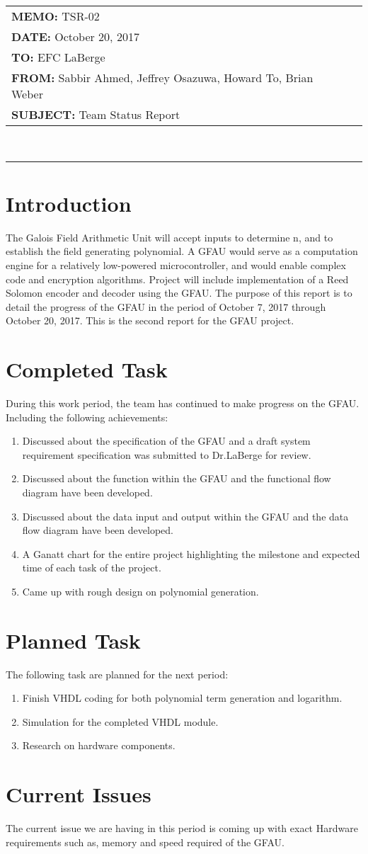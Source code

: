 \documentclass[paper=usletter, fontsize=12pt]{article}
\newcommand{\Sabbir}{Sabbir Ahmed}
\newcommand{\Jeffrey}{Jeffrey Osazuwa}
\newcommand{\Howard}{Howard To}
\newcommand{\Brian}{Brian Weber}
\newcommand{\documentinfo}[5]{
    \begin{centering}
        \parbox{6.8in}{
        \begin{spacing}{1}
            \begin{flushleft}
                \begin{tabular}{l l}
                    #1 \\
                    #2 \\
                    #3 \\
                    #4 \\
                    #5 \\
                \end{tabular} \\
                \rule{\textwidth}{1pt}
            \end{flushleft}
        \end{spacing}
        }
    \end{centering}
}
\begin{document}
\documentinfo{\textbf{MEMO:} TSR-02}{\textbf{DATE: }October 20, 2017}{\textbf{TO: } EFC LaBerge}{\textbf{FROM: }\Sabbir, \Jeffrey, \Howard, \Brian}{\textbf{SUBJECT: } Team Status Report}


\section{Introduction}

The Galois Field Arithmetic Unit will accept inputs to determine n, and to establish the field generating polynomial. A GFAU would serve as a computation engine for a relatively low-powered microcontroller, and would enable complex code and encryption algorithms. Project will include implementation of a Reed Solomon encoder and decoder using the GFAU. The purpose of this report is to detail the progress of the GFAU in the period of October 7, 2017 through October 20, 2017. This is the second report for the GFAU project. 


\section{Completed Task}

During this work period, the team has continued to make progress on the GFAU. Including the following achievements: 

\begin{enumerate}
	\item Discussed about the specification of the GFAU and a draft system requirement specification was submitted to Dr.LaBerge for review.
	\item Discussed about the function within the GFAU and the functional flow diagram have been developed.
	\item Discussed about the data input and output within the GFAU and the data flow diagram have been developed.
	\item A Ganatt chart for the entire project highlighting the milestone and expected time of each task of the project.   
	\item Came up with rough design on polynomial generation.
	
\end{enumerate}
\section{Planned Task}
The following task are planned for the next period:

\begin{enumerate}
	\item Finish VHDL coding for both polynomial term generation and logarithm.
	\item Simulation for the completed VHDL module. 
	\item Research on hardware components.
\end{enumerate}

\section{Current Issues}
The current issue we are having in this period is coming up with exact Hardware requirements such as, memory and speed required of the GFAU.
\end{document}
